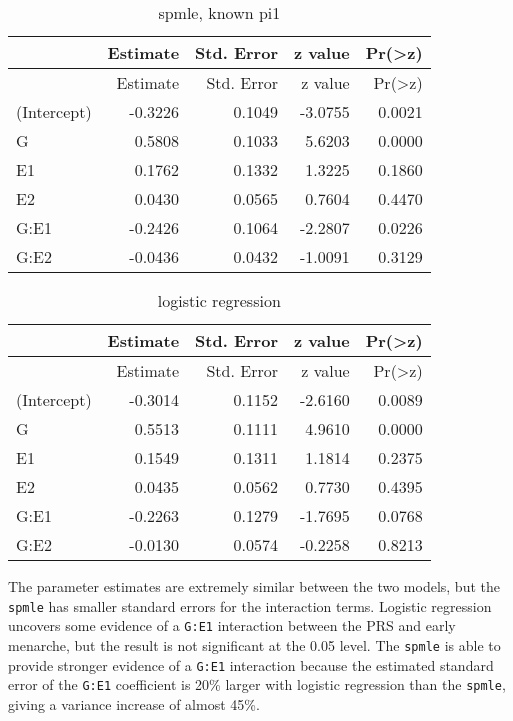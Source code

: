 \documentclass[11pt,]{article}
\newenvironment{Shaded}{\begin{snugshade}}{\end{snugshade}}
\newcommand{\KeywordTok}[1]{\textcolor[rgb]{0.13,0.29,0.53}{\textbf{#1}}}
\newcommand{\DataTypeTok}[1]{\textcolor[rgb]{0.13,0.29,0.53}{#1}}
\newcommand{\DecValTok}[1]{\textcolor[rgb]{0.00,0.00,0.81}{#1}}
\newcommand{\StringTok}[1]{\textcolor[rgb]{0.31,0.60,0.02}{#1}}
\newcommand{\OperatorTok}[1]{\textcolor[rgb]{0.81,0.36,0.00}{\textbf{#1}}}
\newcommand{\NormalTok}[1]{#1}
\begin{document}
\begin{longtable}[]{@{}lrrrr@{}}
\caption{spmle, known pi1}\tabularnewline
\toprule
& Estimate & Std. Error & z value &
Pr(\textgreater{}\textbar{}z\textbar{})\tabularnewline
\midrule
\endfirsthead
\toprule
& Estimate & Std. Error & z value &
Pr(\textgreater{}\textbar{}z\textbar{})\tabularnewline
\midrule
\endhead
(Intercept) & -0.3226 & 0.1049 & -3.0755 & 0.0021\tabularnewline
G & 0.5808 & 0.1033 & 5.6203 & 0.0000\tabularnewline
E1 & 0.1762 & 0.1332 & 1.3225 & 0.1860\tabularnewline
E2 & 0.0430 & 0.0565 & 0.7604 & 0.4470\tabularnewline
G:E1 & -0.2426 & 0.1064 & -2.2807 & 0.0226\tabularnewline
G:E2 & -0.0436 & 0.0432 & -1.0091 & 0.3129\tabularnewline
\bottomrule
\end{longtable}

\begin{Shaded}
\end{Shaded}

\begin{longtable}[]{@{}lrrrr@{}}
\caption{logistic regression}\tabularnewline
\toprule
& Estimate & Std. Error & z value &
Pr(\textgreater{}\textbar{}z\textbar{})\tabularnewline
\midrule
\endfirsthead
\toprule
& Estimate & Std. Error & z value &
Pr(\textgreater{}\textbar{}z\textbar{})\tabularnewline
\midrule
\endhead
(Intercept) & -0.3014 & 0.1152 & -2.6160 & 0.0089\tabularnewline
G & 0.5513 & 0.1111 & 4.9610 & 0.0000\tabularnewline
E1 & 0.1549 & 0.1311 & 1.1814 & 0.2375\tabularnewline
E2 & 0.0435 & 0.0562 & 0.7730 & 0.4395\tabularnewline
G:E1 & -0.2263 & 0.1279 & -1.7695 & 0.0768\tabularnewline
G:E2 & -0.0130 & 0.0574 & -0.2258 & 0.8213\tabularnewline
\bottomrule
\end{longtable}

The parameter estimates are extremely similar between the two models,
but the \texttt{spmle} has smaller standard errors for the interaction
terms. Logistic regression uncovers some evidence of a \texttt{G:E1}
interaction between the PRS and early menarche, but the result is not
significant at the 0.05 level. The \texttt{spmle} is able to provide
stronger evidence of a \texttt{G:E1} interaction because the estimated
standard error of the \texttt{G:E1} coefficient is 20\% larger with
logistic regression than the \texttt{spmle}, giving a variance increase
of almost 45\%.
\end{document}
